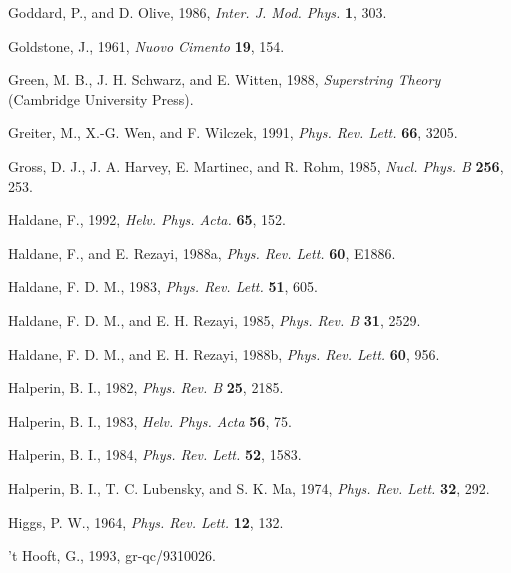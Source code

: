 \begin{list}{}{\setlength{\leftmargin}{2em}\setlength{\itemindent}{-2em}}
\item Goddard, P., and D. Olive, 1986, \emph{Inter. J. Mod. Phys.} \textbf{1}, 303.
\item Goldstone, J., 1961, \emph{Nuovo Cimento} \textbf{19}, 154.
\item Green, M. B., J. H. Schwarz, and E. Witten, 1988, \emph{Superstring Theory} (Cambridge University Press).
\item Greiter, M., X.-G. Wen, and F. Wilczek, 1991, \emph{Phys. Rev. Lett.} \textbf{66}, 3205.
\item Gross, D. J., J. A. Harvey, E. Martinec, and R. Rohm, 1985, \emph{Nucl. Phys. B} \textbf{256}, 253.
\item Haldane, F., 1992, \emph{Helv. Phys. Acta.} \textbf{65}, 152.
\item Haldane, F., and E. Rezayi, 1988a, \emph{Phys. Rev. Lett.} \textbf{60}, E1886.
\item Haldane, F. D. M., 1983, \emph{Phys. Rev. Lett.} \textbf{51}, 605.
\item Haldane, F. D. M., and E. H. Rezayi, 1985, \emph{Phys. Rev. B} \textbf{31}, 2529.
\item Haldane, F. D. M., and E. H. Rezayi, 1988b, \emph{Phys. Rev. Lett.} \textbf{60}, 956.
\item Halperin, B. I., 1982, \emph{Phys. Rev. B} \textbf{25}, 2185.
\item Halperin, B. I., 1983, \emph{Helv. Phys. Acta} \textbf{56}, 75.
\item Halperin, B. I., 1984, \emph{Phys. Rev. Lett.} \textbf{52}, 1583.
\item Halperin, B. I., T. C. Lubensky, and S. K. Ma, 1974, \emph{Phys. Rev. Lett.} \textbf{32}, 292.
\item Higgs, P. W., 1964, \emph{Phys. Rev. Lett.} \textbf{12}, 132.
\item 't Hooft, G., 1993, gr-qc/9310026.


\end{list}
